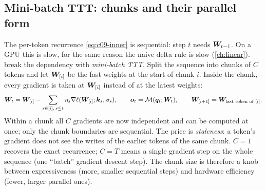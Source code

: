 \subsection{Mini-batch TTT: chunks and their parallel form}\label{sec:c09-minibatch}

The per-token recurrence \eqref{eq:c09-inner} is sequential: step $t$ needs $\bm{W}_{t-1}$. On a
GPU this is slow, for the same reason the naive delta rule is slow (\cref{ch:linear}).
\citet{c02-sun2024ttt} break the dependency with \emph{mini-batch TTT}. Split the sequence into
chunks of $C$ tokens and let $\bm{W}_{[i]}$ be the fast weights at the start of chunk $i$. Inside
the chunk, every gradient is taken at $\bm{W}_{[i]}$ instead of at the latest weights:
\begin{equation}\label{eq:c09-minibatch}
  \bm{W}_t = \bm{W}_{[i]} - \sum_{s \in [i],\, s \le t} \eta_s \nabla\ell(\bm{W}_{[i]}; \bm{k}_s, \bm{v}_s),
  \qquad \bm{o}_t = \mathcal{M}(\bm{q}_t; \bm{W}_t), \qquad \bm{W}_{[i+1]} = \bm{W}_{\text{last token of } [i]} .
\end{equation}
Within a chunk all $C$ gradients are now independent and can be computed at once; only the
chunk boundaries are sequential. The price is \emph{staleness}: a token's gradient does not
see the writes of the earlier tokens of the same chunk. $C = 1$ recovers the exact recurrence;
$C = T$ means a single gradient step on the whole sequence (one ``batch'' gradient descent
step). The chunk size is therefore a knob between expressiveness (more, smaller sequential
steps) and hardware efficiency (fewer, larger parallel ones).

